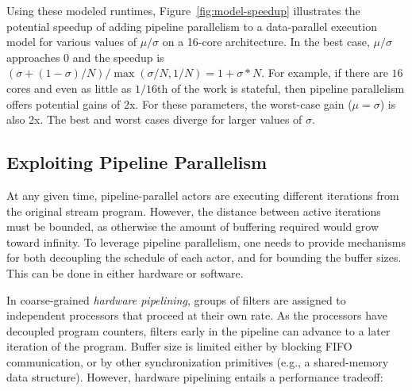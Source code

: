 Using these modeled runtimes, Figure~\ref{fig:model-speedup}
illustrates the potential speedup of adding pipeline parallelism to a
data-parallel execution model for various values of $\mu/\sigma$ on a
16-core architecture.  In the best case, $\mu/\sigma$ approaches $0$
and the speedup is $(\sigma+(1-\sigma)/N)/\max(\sigma/N, 1/N) =
1+\sigma*N$.  For example, if there are $16$ cores and even as little
as $1/16$th of the work is stateful, then pipeline parallelism offers
potential gains of 2x.  For these parameters, the worst-case gain
($\mu=\sigma$) is also 2x.  The best and worst cases diverge for
larger values of $\sigma$.

\subsection{Exploiting Pipeline Parallelism}

At any given time, pipeline-parallel actors are executing different
iterations from the original stream program.  However, the distance
between active iterations must be bounded, as otherwise the amount of
buffering required would grow toward infinity.  To leverage pipeline
parallelism, one needs to provide mechanisms for both decoupling the
schedule of each actor, and for bounding the buffer sizes.  This can
be done in either hardware or software.

In coarse-grained {\it hardware pipelining}, groups of filters are
assigned to independent processors that proceed at their own rate.  As
the processors have decoupled program counters, filters early in the
pipeline can advance to a later iteration of the program.  Buffer size
is limited either by blocking FIFO communication, or by other
synchronization primitives (e.g., a shared-memory data structure).
However, hardware pipelining entails a performance tradeoff:


